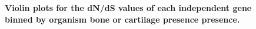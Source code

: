 \documentclass{article}
\begin{document}
\begin{figure}[H]
\centering
{}
\caption{\textbf{Violin plots for the dN/dS values of each independent gene binned by organism bone or cartilage presence presence.}}
\label{fig_6}
\end{figure}
\end{document}
